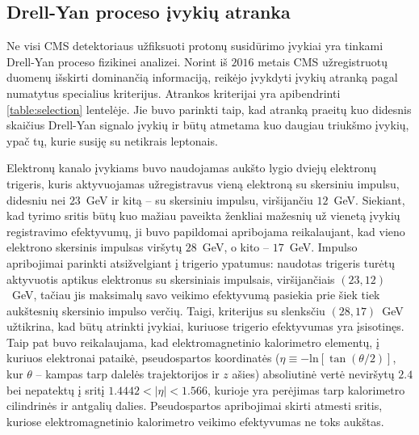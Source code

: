 \documentclass[a4paper, 12pt, oneside]{article}
\newlength\q
\begin{document}
\subsection{Drell-Yan proceso įvykių atranka}\label{sec:selection}
Ne visi CMS detektoriaus užfiksuoti protonų susidūrimo įvykiai yra tinkami Drell-Yan proceso fizikinei analizei.
Norint iš $2016$ metais CMS užregistruotų duomenų išskirti dominančią informaciją, reikėjo įvykdyti įvykių atranką pagal
numatytus specialius kriterijus.
Atrankos kriterijai yra apibendrinti \ref{table:selection} lentelėje.
Jie buvo parinkti taip, kad atranką praeitų kuo didesnis skaičius Drell-Yan signalo įvykių ir būtų atmetama kuo daugiau
triukšmo įvykių, ypač tų, kurie susiję su netikrais leptonais.

Elektronų kanalo įvykiams buvo naudojamas aukšto lygio dviejų elektronų trigeris, kuris aktyvuojamas užregistravus vieną elektroną
su skersiniu impulsu, didesniu nei $23$~GeV ir kitą -- su skersiniu impulsu, viršijančiu $12$~GeV.
Siekiant, kad tyrimo sritis būtų kuo mažiau paveikta ženkliai mažesnių už vienetą įvykių registravimo efektyvumų, ji buvo papildomai
apribojama reikalaujant, kad vieno elektrono skersinis impulsas viršytų $28$~GeV, o kito -- $17$~GeV.
Impulso apribojimai parinkti atsižvelgiant į trigerio ypatumus: naudotas trigeris turėtų aktyvuotis aptikus elektronus
su skersiniais impulsais, viršijančiais $(23, 12)$~GeV, tačiau jis maksimalų savo veikimo efektyvumą pasiekia prie šiek
tiek aukštesnių skersinio impulso verčių.
Taigi, kriterijus su slenksčiu $(28, 17)$~GeV užtikrina, kad būtų atrinkti įvykiai, kuriuose trigerio efektyvumas yra
įsisotinęs.
Taip pat buvo reikalaujama, kad elektromagnetinio kalorimetro elementų, į kuriuos elektronai pataikė, pseudospartos koordinatės
($\eta\equiv -\mathrm{ln}\left[\tan\left(\theta/2\right)\right]$, kur $\theta$ -- kampas tarp dalelės trajektorijos ir $z$ ašies)
absoliutinė vertė neviršytų $2.4$ bei nepatektų į sritį $1.4442<|\eta|<1.566$, kurioje yra perėjimas tarp kalorimetro
cilindrinės ir antgalių dalies.
Pseudospartos apribojimai skirti atmesti sritis, kuriose elektromagnetinio kalorimetro veikimo efektyvumas ne toks
aukštas.
\end{document}
